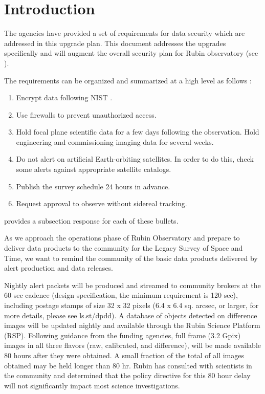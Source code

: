 \section{Introduction}

The agencies have provided a set of requirements for data security which are addressed in this upgrade plan.  This document addresses the upgrades specifically and will augment the overall security plan for Rubin observatory (see ).

The requirements can be organized and summarized at a high level as follows :
\begin{enumerate}

\item	Encrypt data following \gls{NIST} .
\item	Use firewalls to prevent unauthorized  access.
\item	Hold focal plane scientific data for a few days following the observation. Hold engineering and commissioning imaging data for several weeks.
\item	Do not alert on artificial Earth-orbiting satellites.
In order to do this, check some alerts against appropriate satellite catalogs.
\item	Publish the survey schedule 24 hours in advance.
\item	Request approval to observe without sidereal tracking.

\end{enumerate}


 provides a subsection response for each of these bullets.

As we approach the operations phase of Rubin Observatory and prepare to deliver data products to
the community for the Legacy Survey of Space and Time, we want to remind the community of the
basic data products delivered by alert production and data releases.

Nightly alert packets will be produced and streamed to community brokers at the 60 sec cadence
(design specification, the minimum requirement is 120 sec), including postage stamps of size
32 x 32 pixels (6.4 x 6.4 sq. arcsec, or larger, for more details, please see ls.st/dpdd). A database of
objects detected on difference images will be updated nightly and available through the Rubin Science
Platform (RSP). Following guidance from the funding agencies, full frame (3.2 Gpix) images in all
three flavors (raw, calibrated, and difference), will be made available 80 hours after they were obtained.
A small fraction of the total of all images obtained may be held longer than 80 hr. Rubin has consulted
with scientists in the community and determined that the policy directive for this 80 hour delay will not
significantly impact most science investigations.

